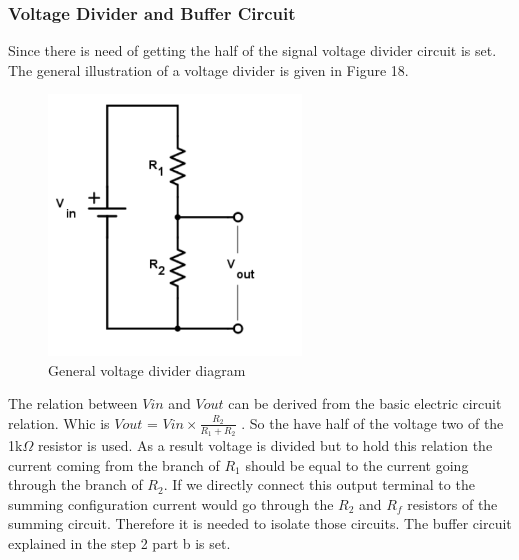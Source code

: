\documentclass[letterpaper,12pt]{article}
\begin{document}
\subsubsection{Voltage Divider and Buffer Circuit}
Since there is need of getting the half of the signal voltage divider circuit is set. The general illustration of a voltage divider is given in Figure 18.
\begin{figure}[H]
	\centering
   \includegraphics[width=0.6\textwidth]{voltage_divider.png}
   \caption{General voltage divider diagram}
\end{figure} 
The relation between \(V{in}\) and \(V{out}\) can be derived from the basic electric circuit relation. Whic is \(V{out}\) = \(V{in} \times \frac{R_2}{R_1+R_2}\) . So the have half of the voltage two of the 1k\(\Omega\) resistor is used.
As a result voltage is divided but to hold this relation the current coming from the branch of \(R_1\) should be equal to the current going through the branch of \(R_2\). If we directly connect this output terminal to the summing configuration current would go through the \(R_2\) and \(R_f\) resistors  of the summing circuit. Therefore it is needed to isolate those circuits. The buffer circuit explained in the step 2 part b is set. 
\end{document}

